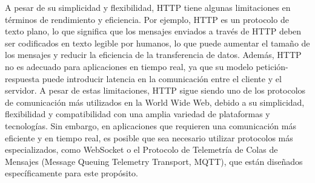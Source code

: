         A pesar de su simplicidad y flexibilidad, HTTP tiene algunas limitaciones en t\'erminos de rendimiento y 
            eficiencia. Por ejemplo, HTTP es un protocolo de texto plano, lo que significa que los mensajes enviados 
            a trav\'es de HTTP deben ser codificados en texto legible por humanos, lo que puede aumentar el tama\~no 
            de los mensajes y reducir la eficiencia de la transferencia de datos. Adem\'as, HTTP no es adecuado para 
            aplicaciones en tiempo real, ya que su modelo petici\'on-respuesta puede introducir latencia en la 
            comunicaci\'on entre el cliente y el servidor. \cite{RFC2616}
    \vskip 0.5cm
        A pesar de estas limitaciones, HTTP sigue siendo uno de los protocolos de comunicaci\'on m\'as utilizados en 
            la World Wide Web, debido a su simplicidad, flexibilidad y compatibilidad con una amplia variedad de 
            plataformas y tecnolog\'ias. Sin embargo, en aplicaciones que requieren una comunicaci\'on m\'as eficiente 
            y en tiempo real, es posible que sea necesario utilizar protocolos m\'as especializados, como WebSocket o 
            el Protocolo de Telemetr\'ia de Colas de Mensajes (Message Queuing Telemetry Transport, MQTT), que est\'an dise\~nados espec\'ificamente para este prop\'osito. \cite{RFC2616}
